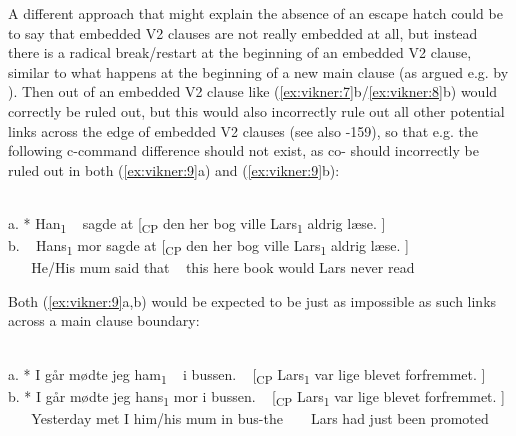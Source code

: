 \documentclass[output=paper]{LSP/langsci}
\begin{document}
	

A different approach that might explain the absence of an escape hatch could be to say that embedded V2 clauses are not really embedded at all, but instead there is a radical break/restart at the beginning of an embedded V2 clause, similar to what happens at the beginning of a new main clause (as argued e.g. by \citealt{Petersson2014}). Then  out of an embedded V2 clause like (\ref{ex:vikner:7}b/\ref{ex:vikner:8}b) would correctly be ruled out, but this would also incorrectly rule out all other potential links across the edge of embedded V2 clauses (see also \citealt[157]{Julien2015}-159), so that e.g. the following c-command difference should not exist, as co- should incorrectly be ruled out in both (\ref{ex:vikner:9}a) and (\ref{ex:vikner:9}b):

\ea%
    \label{ex:vikner:9}
    
    \\

    \glll a. *  Han\textsubscript{1}   ~   sagde  at  [\textsubscript{CP}  den  her  bog  ville  Lars\textsubscript{1}  aldrig  læse.  ]\\
	b.  ~   Hans\textsubscript{1}  mor  sagde  at  [\textsubscript{CP}  den  her  bog  ville  Lars\textsubscript{1}  aldrig  læse.  ]\\
  ~ ~   {He/His}  {mum}  {said}  {that}   ~   {this}  {here}  {book}  {would}  {Lars}  {never}  {read}  \\
    \z

	  

Both (\ref{ex:vikner:9}a,b) would be expected to be just as impossible as such links across a main clause boundary:

\ea%
\let\eachwordone=\small 
\let\eachwordtwo=\small
\let\eachwordthree=\small
\small
    \label{ex:vikner:10}  
     \\
    \glll a. *  {I går}  mødte  jeg  ham\textsubscript{1}   ~   i  bussen.   ~   [\textsubscript{CP}  Lars\textsubscript{1}  var  lige  blevet  forfremmet.  ]\\
	  b. *  {I går}  mødte  jeg  hans\textsubscript{1}  mor  i  bussen.   ~   [\textsubscript{CP}  Lars\textsubscript{1}  var  lige  blevet  forfremmet.  ]\\
  ~ ~   {Yesterday}  {met}  {I}  {him/his}  {mum}  {in}  {bus-the}   ~    ~   {Lars}  {had}  {just}  {been}  {promoted}  \\
    \z
\end{document}

